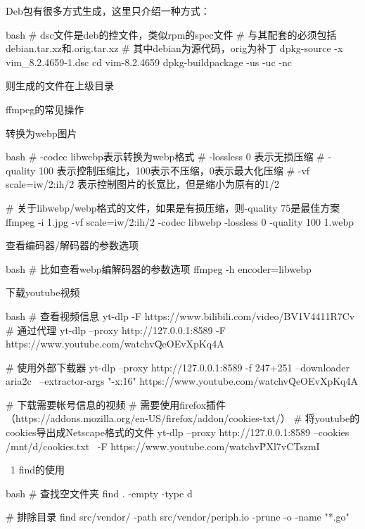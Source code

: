 \begin{outline}[enumerate]
Deb包有很多方式生成，这里只介绍一种方式：
\begin{code-block}{bash}
# dsc文件是deb的控文件，类似rpm的spec文件
# 与其配套的必须包括debian.tar.xz和.orig.tar.xz
# 其中debian为源代码，orig为补丁
dpkg-source -x  vim_8.2.4659-1.dsc
cd vim-8.2.4659
dpkg-buildpackage -us -uc -nc
\end{code-block}

则生成的文件在上级目录

\1 ffmpeg的常见操作

\2 转换为webp图片

\begin{code-block}{bash}
# -codec libwebp表示转换为webp格式
# -lossless 0 表示无损压缩
# -quality 100 表示控制压缩比，100表示不压缩，0表示最大化压缩
# -vf scale=iw/2:ih/2 表示控制图片的长宽比，但是缩小为原有的1/2

# 关于libwebp/webp格式的文件，如果是有损压缩，则-quality 75是最佳方案
ffmpeg -i 1.jpg  -vf scale=iw/2:ih/2 -codec libwebp -lossless 0 -quality 100 1.webp
\end{code-block}

\2 查看编码器/解码器的参数选项

\begin{code-block}{bash}
# 比如查看webp编解码器的参数选项
ffmpeg -h encoder=libwebp
\end{code-block}

\1 下载youtube视频

\begin{code-block}{bash}
# 查看视频信息
yt-dlp -F https://www.bilibili.com/video/BV1V4411R7Cv
# 通过代理
yt-dlp --proxy http://127.0.0.1:8589 -F https://www.youtube.com/watch\?v\=QeOEvXpKq4A

# 使用外部下载器
yt-dlp --proxy http://127.0.0.1:8589 -f 247+251 --downloader aria2c \
  --extractor-args "-x:16" https://www.youtube.com/watch\?v\=QeOEvXpKq4A

# 下载需要帐号信息的视频
# 需要使用firefox插件（https://addons.mozilla.org/en-US/firefox/addon/cookies-txt/）
# 将youtube的cookies导出成Netscape格式的文件
yt-dlp --proxy http://127.0.0.1:8589 --cookies /mnt/d/cookies.txt \
  -F https://www.youtube.com/watch\?v\=PXl7vCTszmI
\end{code-block}

\ 1 find的使用

\begin{code-block}{bash}
# 查找空文件夹
find . -empty -type d

# 排除目录
find src/vendor/ -path src/vendor/periph.io -prune -o -name "*.go"
\end{code-block}

\end{outline}



